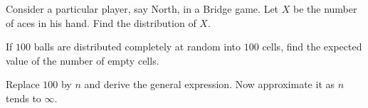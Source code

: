\begin{problem}[Handout 1, \# 16]
  Consider a particular player, say North, in a Bridge game. Let \(X\) be
  the number of aces in his hand. Find the distribution of \(X\).
\end{problem}
\begin{solution}
\end{solution}

\begin{problem}[Handout 1, \# 20]
  If \(100\) balls are distributed completely at random into \(100\) cells,
  find the expected value of the number of empty cells.

  \noindent Replace \(100\) by \(n\) and derive the general expression. Now
  approximate it as \(n\) tends to \(\infty\).
\end{problem}
\begin{solution}
\end{solution}

